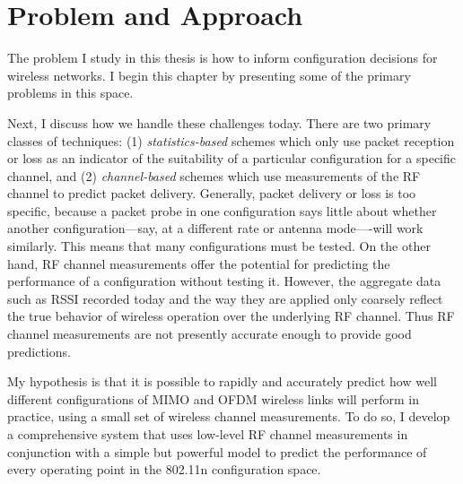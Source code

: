 \ifx\mainfile\undefined

\setcounter{chapter}{2} %
\fi

\cleardoublepage
\chapter{Problem and Approach}
\label{chap:problem}
\label{chap:approach}

The problem I study in this thesis is how to inform configuration decisions for wireless networks. I begin this chapter by presenting some of the primary problems in this space.

Next, I discuss how we handle these challenges today. There are two primary classes of techniques: (1) \emph{statistics-based} schemes which only use packet reception or loss as an indicator of the suitability of a particular configuration for a specific channel, and (2) \emph{channel-based} schemes which use measurements of the RF channel to predict packet delivery. Generally, packet delivery or loss is too specific, because a packet probe in one configuration says little about whether another configuration---say, at a different rate or antenna mode----will work similarly. This means that many configurations must be tested. On the other hand, RF channel measurements offer the potential for predicting the performance of a configuration without testing it. However, the aggregate data such as RSSI recorded today and the way they are applied only coarsely reflect the true behavior of wireless operation over the underlying RF channel. Thus RF channel measurements are not presently accurate enough to provide good predictions.

My hypothesis is that it is possible to rapidly and accurately predict how well different configurations of MIMO and OFDM wireless links will perform in practice, using a small set of wireless channel measurements. To do so, I develop a comprehensive system that uses low-level RF channel measurements in conjunction with a simple but powerful model to predict the performance of every operating point in the 802.11n configuration space. 


%
